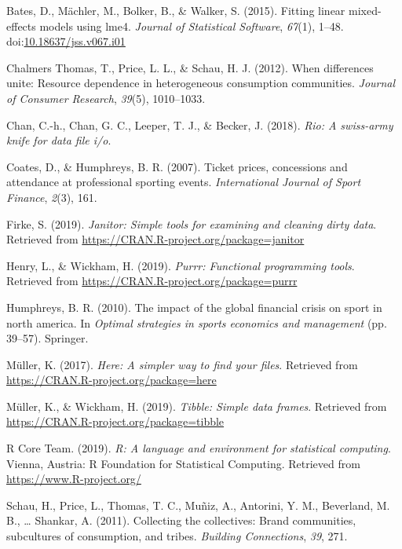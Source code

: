 \documentclass[man, fleqn, noextraspace,floatsintext]{apa6}
\begin{document}
\leavevmode\hypertarget{ref-R-lme4}{}%
Bates, D., Mächler, M., Bolker, B., \& Walker, S. (2015). Fitting linear mixed-effects models using lme4. \emph{Journal of Statistical Software}, \emph{67}(1), 1--48. doi:\href{https://doi.org/10.18637/jss.v067.i01}{10.18637/jss.v067.i01}

\leavevmode\hypertarget{ref-chalmers_et_al_2012}{}%
Chalmers Thomas, T., Price, L. L., \& Schau, H. J. (2012). When differences unite: Resource dependence in heterogeneous consumption communities. \emph{Journal of Consumer Research}, \emph{39}(5), 1010--1033.

\leavevmode\hypertarget{ref-R-rio}{}%
Chan, C.-h., Chan, G. C., Leeper, T. J., \& Becker, J. (2018). \emph{Rio: A swiss-army knife for data file i/o}.

\leavevmode\hypertarget{ref-coates_humphreys_2007}{}%
Coates, D., \& Humphreys, B. R. (2007). Ticket prices, concessions and attendance at professional sporting events. \emph{International Journal of Sport Finance}, \emph{2}(3), 161.

\leavevmode\hypertarget{ref-R-janitor}{}%
Firke, S. (2019). \emph{Janitor: Simple tools for examining and cleaning dirty data}. Retrieved from \url{https://CRAN.R-project.org/package=janitor}

\leavevmode\hypertarget{ref-R-purrr}{}%
Henry, L., \& Wickham, H. (2019). \emph{Purrr: Functional programming tools}. Retrieved from \url{https://CRAN.R-project.org/package=purrr}

\leavevmode\hypertarget{ref-humphreys_2010}{}%
Humphreys, B. R. (2010). The impact of the global financial crisis on sport in north america. In \emph{Optimal strategies in sports economics and management} (pp. 39--57). Springer.

\leavevmode\hypertarget{ref-R-here}{}%
Müller, K. (2017). \emph{Here: A simpler way to find your files}. Retrieved from \url{https://CRAN.R-project.org/package=here}

\leavevmode\hypertarget{ref-R-tibble}{}%
Müller, K., \& Wickham, H. (2019). \emph{Tibble: Simple data frames}. Retrieved from \url{https://CRAN.R-project.org/package=tibble}

\leavevmode\hypertarget{ref-R-base}{}%
R Core Team. (2019). \emph{R: A language and environment for statistical computing}. Vienna, Austria: R Foundation for Statistical Computing. Retrieved from \url{https://www.R-project.org/}

\leavevmode\hypertarget{ref-shankar_et_al_2011}{}%
Schau, H., Price, L., Thomas, T. C., Muñiz, A., Antorini, Y. M., Beverland, M. B., \ldots{} Shankar, A. (2011). Collecting the collectives: Brand communities, subcultures of consumption, and tribes. \emph{Building Connections}, \emph{39}, 271.
\end{document}
